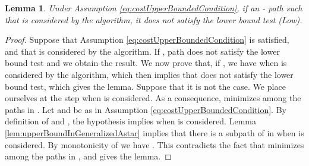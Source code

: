 \documentclass[11pt]{amsart}
\theoremstyle{plain}
\newtheorem{lem}[theo]{Lemma}
\theoremstyle{remark}
\begin{document}
\begin{lem}\label{lem:pathsNotBoundedByQm}
Under Assumption \eqref{eq:costUpperBoundedCondition}, if an - path  such that  is considered by the algorithm, it does not satisfy the lower bound test (Low).
\end{lem}
\begin{proof}


Suppose that Assumption \eqref{eq:costUpperBoundedCondition} is satisfied, and that  is considered by the algorithm. If , path  does not satisfy the lower bound test and we obtain the result. We now prove that, if , we have  when  is considered by the algorithm, which then implies that  does not satisfy the lower bound test, which gives the lemma. Suppose that it is not the case. We place ourselves at the step when  is considered. As a consequence,  minimizes  among the paths in . Let  and  be as in Assumption \eqref{eq:costUpperBoundedCondition}. By definition of  and , the hypothesis  implies  when  is considered. Lemma \ref{lem:upperBoundInGeneralizedAstar} implies that there is a subpath  of  in  when  is considered. By monotonicity of  we have . This contradicts the fact that  minimizes  among the paths in , and gives the lemma.
\end{proof}
\end{document}
